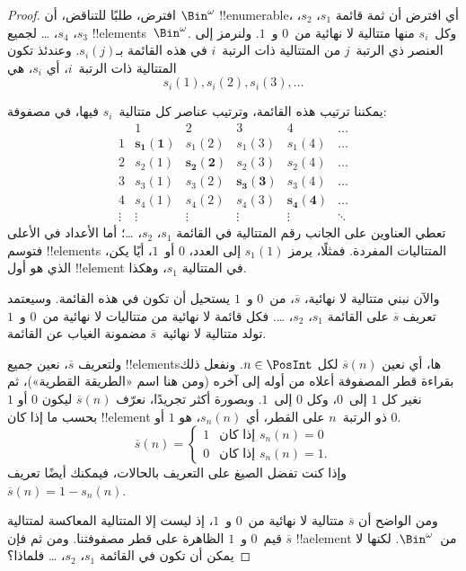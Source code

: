 \documentclass[../../../include/open-logic-section]{subfiles}
\begin{document}
\begin{proof}
افترض، طلبًا للتناقض، أن $\Bin^\omega$ !!{enumerable}، أي افترض أن
ثمة قائمة $s_{1}$، $s_{2}$، $s_{3}$، $s_{4}$، \dots{} لجميع
!!{element}s~$\Bin^\omega$. وكل~$s_i$ منها متتالية لا نهائية
من~$0$ و~$1$. ولنرمز إلى العنصر ذي الرتبة~$j$ من المتتالية ذات
الرتبة~$i$ في هذه القائمة بـ$s_i(j)$. وعندئذ تكون المتتالية ذات الرتبة~$i$، أي
$s_i$، هي
\[
s_i(1), s_i(2), s_i(3), \dots
\]

يمكننا ترتيب هذه القائمة، وترتيب عناصر كل متتالية~$s_i$ فيها،
في مصفوفة:
\[
\begin{array}{c|c|c|c|c|c}
& 1 & 2 & 3 & 4 & \dots \\\hline
1 & \mathbf{s_{1}(1)} & s_{1}(2) & s_{1}(3) & s_1(4) & \dots \\\hline
2 & s_{2}(1)& \mathbf{s_{2}(2)} & s_2(3) & s_2(4) & \dots \\\hline
3 & s_{3}(1)& s_{3}(2) & \mathbf{s_3(3)} & s_3(4) & \dots \\\hline
4 & s_{4}(1)& s_{4}(2) & s_4(3) & \mathbf{s_4(4)} & \dots \\\hline
\vdots & \vdots & \vdots & \vdots & \vdots & \mathbf{\ddots}
\end{array}
\]
تعطي العناوين على الجانب رقم المتتالية في القائمة $s_1$، $s_2$،
\dots؛ أما الأعداد في الأعلى فتوسم !!{element}s المتتاليات المفردة.
فمثلًا، يرمز $s_{1}(1)$ إلى العدد، $0$ أو~$1$، أيًا يكن، الذي هو أول
!!{element} في المتتالية $s_{1}$، وهكذا.

والآن نبني متتالية لا نهائية، $\overline{s}$، من~$0$ و~$1$ يستحيل
أن تكون في هذه القائمة. وسيعتمد تعريف $\overline{s}$ على القائمة
$s_1$، $s_2$، \dots. فكل قائمة لا نهائية من متتاليات لا نهائية
من~$0$ و~$1$ تولد متتالية لا نهائية~$\overline{s}$ مضمونة الغياب عن
القائمة.

ولتعريف $\overline{s}$، نعين جميع !!{element}sها، أي نعين
$\overline{s}(n)$ لكل $n \in \PosInt$. ونفعل ذلك بقراءة قطر المصفوفة
أعلاه من أوله إلى آخره (ومن هنا اسم «الطريقة القطرية»)، ثم نغير كل
$1$ إلى~$0$، وكل $0$ إلى~$1$. وبصورة أكثر تجريدًا، نعرّف
$\overline{s}(n)$ ليكون $0$ أو $1$ بحسب ما إذا كان !!{element} ذو
الرتبة~$n$ على القطر، أي $s_n(n)$، هو $1$ أو $0$.
\[
\overline{s}(n) =
\begin{cases}
1 & \text{إذا كان $s_{n}(n) = 0$}\\
0 & \text{إذا كان $s_{n}(n) = 1$}.
\end{cases}
\]
وإذا كنت تفضل الصيغ على التعريف بالحالات، فيمكنك أيضًا تعريف
$\overline{s}(n) = 1 - s_n(n)$.

ومن الواضح أن $\overline{s}$ متتالية لا نهائية من~$0$ و~$1$، إذ ليست
إلا المتتالية المعاكسة لمتتالية قيم~$0$ و~$1$ الظاهرة على قطر
مصفوفتنا. ومن ثم فإن $\overline{s}$ !!a{element} من~$\Bin^\omega$.
لكنها لا يمكن أن تكون في القائمة $s_1$، $s_2$، \dots{} فلماذا؟


\end{proof}
\end{document}
